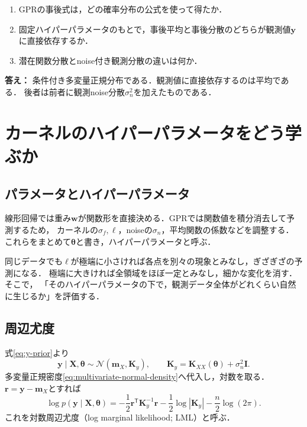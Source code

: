 \documentclass[a4paper,11pt]{ltjsarticle}
\newcommand{\N}{\mathcal N}
\newcommand{\I}{\bm I}
\newcommand{\T}{\mathsf T}
\begin{document}
\enlargethispage{2\baselineskip}
\begin{checkpointbox}
\begin{enumerate}
  \item GPRの事後式は，どの確率分布の公式を使って得たか．
  \item 固定ハイパーパラメータのもとで，事後平均と事後分散のどちらが観測値\(\bm y\)に直接依存するか．
  \item 潜在関数分散とnoise付き観測分散の違いは何か．
\end{enumerate}
\textbf{答え：} 条件付き多変量正規分布である．観測値に直接依存するのは平均である．
後者は前者に観測noise分散\(\sigma_n^2\)を加えたものである．
\end{checkpointbox}

\section{カーネルのハイパーパラメータをどう学ぶか}
\label{sec:hyperparameters}

\subsection{パラメータとハイパーパラメータ}

線形回帰では重み\(\bm w\)が関数形を直接決める．GPRでは関数値を積分消去して予測するため，
カーネルの\(\sigma_f,\ell\)，noiseの\(\sigma_n\)，平均関数の係数などを調整する．
これらをまとめて\(\bm\theta\)と書き，ハイパーパラメータと呼ぶ．

同じデータでも\(\ell\)が極端に小さければ各点を別々の現象とみなし，ぎざぎざの予測になる．
極端に大きければ全領域をほぼ一定とみなし，細かな変化を消す．そこで，
「そのハイパーパラメータの下で，観測データ全体がどれくらい自然に生じるか」を評価する．

\subsection{周辺尤度}

式\eqref{eq:y-prior}より
\begin{equation}
  \bm y\mid\bm X,\bm\theta
  \sim\N(\bm m_X,\bm K_y),
  \qquad
  \bm K_y=\bm K_{XX}(\bm\theta)+\sigma_n^2\I.
\end{equation}
多変量正規密度\eqref{eq:multivariate-normal-density}へ代入し，対数を取る．
\(\bm r=\bm y-\bm m_X\)とすれば
\begin{equation}
  \boxed{
  \log p(\bm y\mid\bm X,\bm\theta)
  =-\frac12\bm r^\T\bm K_y^{-1}\bm r
  -\frac12\log|\bm K_y|
  -\frac n2\log(2\pi).}
  \label{eq:log-marginal-likelihood}
\end{equation}
これを対数周辺尤度（log marginal likelihood; LML）と呼ぶ．
\end{document}
